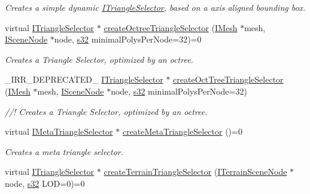 \begin{DoxyCompactItemize}
\begin{DoxyCompactList}\small\item\em Creates a simple dynamic \hyperlink{classirr_1_1scene_1_1ITriangleSelector}{I\+Triangle\+Selector}, based on a axis aligned bounding box. \end{DoxyCompactList}\item 
virtual \hyperlink{classirr_1_1scene_1_1ITriangleSelector}{I\+Triangle\+Selector} $\ast$ \hyperlink{classirr_1_1scene_1_1ISceneManager_a4ed7d3b34f4d0c70395b6d464fe32b96}{create\+Octree\+Triangle\+Selector} (\hyperlink{classirr_1_1scene_1_1IMesh}{I\+Mesh} $\ast$mesh, \hyperlink{classirr_1_1scene_1_1ISceneNode}{I\+Scene\+Node} $\ast$node, \hyperlink{namespaceirr_ac66849b7a6ed16e30ebede579f9b47c6}{s32} minimal\+Polys\+Per\+Node=32)=0
\begin{DoxyCompactList}\small\item\em Creates a Triangle Selector, optimized by an octree. \end{DoxyCompactList}\item 
\+\_\+\+I\+R\+R\+\_\+\+D\+E\+P\+R\+E\+C\+A\+T\+E\+D\+\_\+ \hyperlink{classirr_1_1scene_1_1ITriangleSelector}{I\+Triangle\+Selector} $\ast$ \hyperlink{classirr_1_1scene_1_1ISceneManager_a67f20d1a535645048f2f7e2b5c670656}{create\+Oct\+Tree\+Triangle\+Selector} (\hyperlink{classirr_1_1scene_1_1IMesh}{I\+Mesh} $\ast$mesh, \hyperlink{classirr_1_1scene_1_1ISceneNode}{I\+Scene\+Node} $\ast$node, \hyperlink{namespaceirr_ac66849b7a6ed16e30ebede579f9b47c6}{s32} minimal\+Polys\+Per\+Node=32)
\begin{DoxyCompactList}\small\item\em //! Creates a Triangle Selector, optimized by an octree. \end{DoxyCompactList}\item 
virtual \hyperlink{classirr_1_1scene_1_1IMetaTriangleSelector}{I\+Meta\+Triangle\+Selector} $\ast$ \hyperlink{classirr_1_1scene_1_1ISceneManager_aee99e59dc55fe9f8c3507df68f84a9ff}{create\+Meta\+Triangle\+Selector} ()=0
\begin{DoxyCompactList}\small\item\em Creates a meta triangle selector. \end{DoxyCompactList}\item 
virtual \hyperlink{classirr_1_1scene_1_1ITriangleSelector}{I\+Triangle\+Selector} $\ast$ \hyperlink{classirr_1_1scene_1_1ISceneManager_af52f8c74e08637b7643d239542371bc5}{create\+Terrain\+Triangle\+Selector} (\hyperlink{classirr_1_1scene_1_1ITerrainSceneNode}{I\+Terrain\+Scene\+Node} $\ast$node, \hyperlink{namespaceirr_ac66849b7a6ed16e30ebede579f9b47c6}{s32} L\+OD=0)=0

\end{DoxyCompactItemize}
